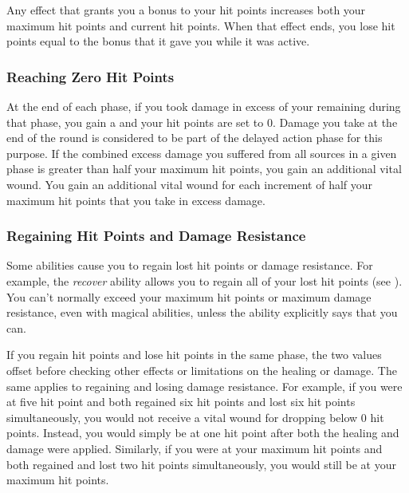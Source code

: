          Any effect that grants you a bonus to your hit points increases both your maximum hit points and current hit points.
        When that effect ends, you lose hit points equal to the bonus that it gave you while it was active.

        \subsubsection{Reaching Zero Hit Points}\label{Reaching Zero Hit Points}
        At the end of each phase, if you took damage in excess of your remaining  during that phase, you gain a  and your hit points are set to 0.
        Damage you take at the end of the round is considered to be part of the delayed action phase for this purpose.
        If the combined excess damage you suffered from all sources in a given phase is greater than half your maximum hit points, you gain an additional vital wound.
        You gain an additional vital wound for each increment of half your maximum hit points that you take in excess damage.

        \subsubsection{Regaining Hit Points and Damage Resistance}\label{Regaining Hit Points and Damage Resistance}
            Some abilities cause you to regain lost hit points or damage resistance.
            For example, the \textit{recover} ability allows you to regain all of your lost hit points (see ).
            You can't normally exceed your maximum hit points or maximum damage resistance, even with magical abilities, unless the ability explicitly says that you can.

             If you regain hit points and lose hit points in the same phase, the two values offset before checking other effects or limitations on the healing or damage.
            The same applies to regaining and losing damage resistance.
            For example, if you were at five hit point and both regained six hit points and lost six hit points simultaneously, you would not receive a vital wound for dropping below 0 hit points.
            Instead, you would simply be at one hit point after both the healing and damage were applied.
            Similarly, if you were at your maximum hit points and both regained and lost two hit points simultaneously, you would still be at your maximum hit points.

